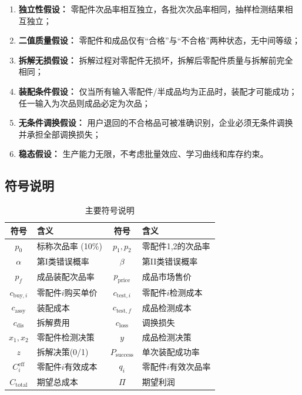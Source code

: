 \documentclass[12pt,a4paper]{ctexart}
\begin{document}
\begin{enumerate}[label=(\arabic*)]
    \item \textbf{独立性假设：} 零配件次品率相互独立，各批次次品率相同，抽样检测结果相互独立；
    \item \textbf{二值质量假设：} 零配件和成品仅有``合格''与``不合格''两种状态，无中间等级；
    \item \textbf{拆解无损假设：} 拆解过程对零配件无损坏，拆解后零配件质量与拆解前完全相同；
    \item \textbf{装配条件假设：} 仅当所有输入零配件/半成品均为正品时，装配才可能成功；任一输入为次品则成品必定为次品；
    \item \textbf{无条件调换假设：} 用户退回的不合格品可被准确识别，企业必须无条件调换并承担全部调换损失；
    \item \textbf{稳态假设：} 生产能力无限，不考虑批量效应、学习曲线和库存约束。
\end{enumerate}

\subsection{符号说明}

\begin{table}[H]
\centering
\caption{主要符号说明}
\begin{tabular}{c|l|c|l}
\toprule
\textbf{符号} & \textbf{含义} & \textbf{符号} & \textbf{含义} \\
\midrule
$p_0$ & 标称次品率 (10\%) & $p_1,p_2$ & 零配件1,2的次品率 \\
$\alpha$ & 第I类错误概率 & $\beta$ & 第II类错误概率 \\
$p_f$ & 成品装配次品率 & $p_{\text{price}}$ & 成品市场售价 \\
$c_{\text{buy},i}$ & 零配件$i$购买单价 & $c_{\text{test},i}$ & 零配件$i$检测成本 \\
$c_{\text{assy}}$ & 装配成本 & $c_{\text{test},f}$ & 成品检测成本 \\
$c_{\text{dis}}$ & 拆解费用 & $c_{\text{loss}}$ & 调换损失 \\
$x_1,x_2$ & 零配件检测决策 & $y$ & 成品检测决策 \\
$z$ & 拆解决策(0/1) & $P_{\text{success}}$ & 单次装配成功率 \\
$C_i^{\text{eff}}$ & 零配件$i$有效成本 & $q_i$ & 零配件$i$有效次品率 \\
$C_{\text{total}}$ & 期望总成本 & $\Pi$ & 期望利润 \\
\bottomrule
\end{tabular}
\end{table}
\end{document}
